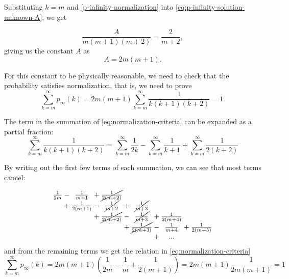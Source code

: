 Substituting $k = m$ and \autoref{p-infinity-normalization} into \autoref{eq:p-infinity-solution-unknown-A}, we get 

\begin{equation}
	\frac{A}{m(m+1)(m+2)} = \frac{2}{m+2}, 
\end{equation}
giving us the constant $A$ as
\begin{equation}
	A = 2m(m+1).
	\label{eq:normalization-constant}
\end{equation}

For this constant to be physically reasonable, we need to check that the probability satisfies normalization, that is, we need to prove
\begin{equation}
	\sum_{k=m}^\infty p_{\infty}(k) = 2m(m+1)\sum_{k=m}^\infty \frac{1}{k(k+1)(k+2)} = 1. 
	\label{eq:normalization-criteria}
\end{equation}

The term in the summation of \autoref{eq:normalization-criteria} can be expanded as a partial fraction:
\begin{equation}
	\sum_{k=m}^\infty \frac{1}{k(k+1)(k+2)} = \sum_{k=m}^\infty \frac{1}{2k} - \sum_{k=m}^\infty \frac{1}{k+1} + \sum_{k=m}^\infty \frac{1}{2(k+2)}
	\label{eq:partial-fractions}
\end{equation}

By writing out the first few terms of each summation, we can see that most terms cancel:

\begin{equation}
\setlength{\arraycolsep}{0pt}%
\newcolumntype{B}{>{{}}c<{{}}}
\begin{array}{ B l B l B l B l B l B}
	\frac{1}{2m} & {}-{} &\frac{1}{m+1} & {}+{} & \cancel{\frac{1}{2(m+2)}} & \\
	& {}+{} & \frac{1}{2(m+1)} & {}-{} &\cancel{\frac{1}{m+2}} & {}+{} &\cancel{\frac{1}{m+3}} \\
	& & & {}+{} & \cancel{\frac{1}{2(m+2)}} & {}-{} & \cancel{\frac{1}{m+3}} & {}+{} &\frac{1}{2(m+4)} \\
	& & & & & {}+{}& \cancel{\frac{1}{2(m+3)}} & {}-{} & \frac{1}{m+4} & {}+{} & \frac{1}{2(m+5)} \\
	& & & & & & & {}+{}& ...\\
\end{array}
\label{eq:summation-cancel}
\end{equation}
and from the remaining terms we get the relation in \autoref{eq:normalization-criteria}
\begin{equation}
	 \sum_{k=m}^\infty p_{\infty}(k) = 2m(m+1)\left ( \frac{1}{2m} - \frac{1}{m} + \frac{1}{2(m+1)} \right ) = 2m(m+1) \frac{1}{2m(m+1)} = 1
	 \label{eq:normalization-satisfied}
\end{equation}

